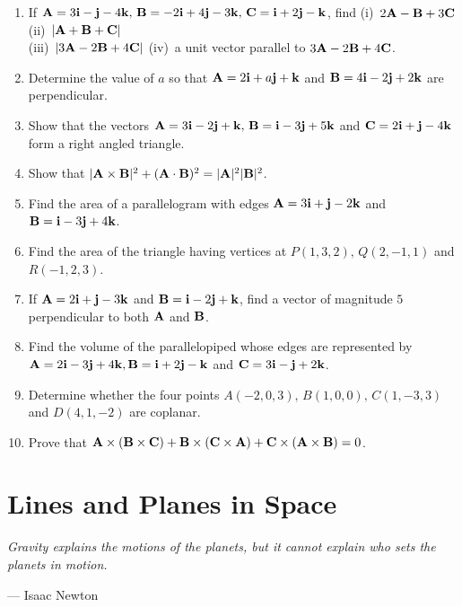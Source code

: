 \documentclass[titlepage,a4paper,12pt]{report}
\begin{document}
\begin{enumerate}
\item If ${\bf{A}}=3{\bf{i}}-{\bf{j}}-4{\bf{k}}, \, {\bf{B}}=-2{\bf{i}}+4{\bf{j}}-3{\bf{k}}, \, {\bf{C}}={\bf{i}}+2{\bf{j}}-{\bf{k}}$, find (i)\, $2{\bf{A}}-{\bf{B}}+3{\bf{C}}$ \quad (ii)\, $|{\bf{A}}+{\bf{B}}+{\bf{C}}|$\\
(iii)\, $|3{\bf{A}}-2{\bf{B}}+4{\bf{C}}|$ \quad (iv)\, a unit vector parallel to $3{\bf{A}}-2{\bf{B}}+4{\bf{C}}$.
\item Determine the value of $a$ so that ${\bf{A}}=2{\bf{i}}+a{\bf{j}}+{\bf{k}}$ and ${\bf{B}}=4{\bf{i}}-2{\bf{j}}+2{\bf{k}}$ are perpendicular.
\item Show that the vectors ${\bf{A}}=3{\bf{i}}-2{\bf{j}}+{\bf{k}}, \, {\bf{B}}={\bf{i}}-3{\bf{j}}+5{\bf{k}}$ and ${\bf{C}}=2{\bf{i}}+{\bf{j}}-4{\bf{k}}$ form a right angled triangle.
\item Show that $|{\bf{A} \times \bf{B}}|^2+ ({\bf{A}\cdot \bf{B}})^2=|{\bf{A}}|^2|{\bf{B}}|^2$.
\item Find the area of a parallelogram  with edges ${\bf{A}}=3{\bf{i}}+{\bf{j}}-2{\bf{k}}$ and ${\bf{B}}={\bf{i}}-3{\bf{j}}+4{\bf{k}}$.
\item Find the area of the triangle having vertices at $P(1,3,2), \, Q(2,-1,1)$ and $R(-1,2,3)$.
\item If ${\bf{A}}=2{\bf{i}}+{\bf{j}}-3{\bf{k}}$ and ${\bf{B}}={\bf{i}}-2{\bf{j}}+{\bf{k}}$, find a vector of magnitude $5$ perpendicular to both ${\bf{A}}$ and ${\bf{B}}$.
\item Find the volume of the parallelopiped whose edges are represented by ${\bf{A}}=2{\bf{i}}-3{\bf{j}}+4{\bf{k}}, \\ {\bf{B}}={\bf{i}}+2{\bf{j}}-{\bf{k}}$ and ${\bf{C}}=3{\bf{i}}-{\bf{j}}+2{\bf{k}}$.
\item Determine whether the four points $A(-2, 0, 3), \, B(1,0,0), \, C(1,-3,3)$ and $D(4,1,-2)$ are coplanar.
\item Prove that ${\bf{A}\times (\bf{B}\times \bf{C})}+{\bf{B}\times (\bf{C}\times \bf{A})}+{\bf{C}\times (\bf{A}\times \bf{B})}=0$.
\end{enumerate}
\chapter{Lines and Planes in Space}\begin{center}
	\small{\parbox{18cm}{
		\begin{raggedright}
		{\small
		\textit{Gravity explains the motions of the planets, but it cannot explain who sets the planets in motion.}
 }
 
				\vspace{.5cm}\hfill{--- Isaac Newton}
		\end{raggedright}
	}
} 
\end{center}
\end{document}
